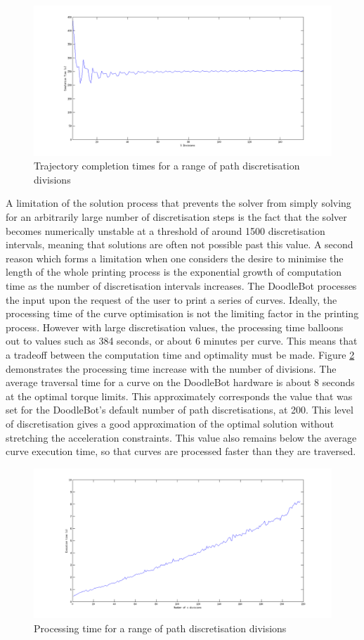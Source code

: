 \begin{figure}[htbp]  
\includegraphics[width=\textwidth]{figures/performance/sDivisions.png}
\caption[Trajectory completion time for a range of path discretisation divisions]{Trajectory completion times for a range of path discretisation divisions
\label{fig:sDivisions}}
\end{figure} 

A limitation of the solution process that prevents the solver from simply solving for an arbitrarily large number of discretisation steps is the fact that the solver becomes numerically unstable at a threshold of around 1500 discretisation intervals, meaning that solutions are often not possible past this value. A second reason which forms a limitation when one considers the desire to minimise the length of the whole printing process is the exponential growth of computation time as the number of discretisation intervals increases. The DoodleBot processes the input upon the request of the user to print a series of curves. Ideally, the processing time of the curve optimisation is not the limiting factor in the printing process. However with large discretisation values, the processing time balloons out to values such as 384 seconds, or about 6 minutes per curve. This means that a tradeoff between the computation time and optimality must be made. Figure \ref{fig:sDivTime} demonstrates the processing time increase with the number of divisions. The average traversal time for a curve on the DoodleBot hardware is about 8 seconds at the optimal torque limits. This approximately corresponds the value that was set for the DoodleBot's default number of path discretisations, at 200. This level of discretisation gives a good approximation of the optimal solution without stretching the acceleration constraints. This value also remains below the average curve execution time, so that curves are processed faster than they are traversed.

\begin{figure}[htbp]  
\includegraphics[width=\textwidth]{figures/performance/sDivTime.png}
\caption[Processing time for a range of path discretisation divisions]{Processing time for a range of path discretisation divisions
\label{fig:sDivTime}}
\end{figure} 


